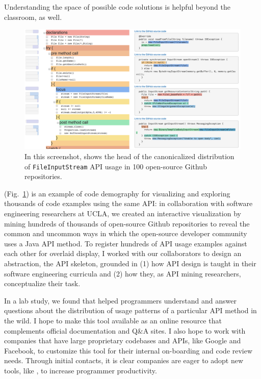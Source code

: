 \documentclass[justified]{tufte-handout}
\begin{document}
Understanding the space of possible code solutions is helpful beyond the classroom, as well. 
\begin{figure}[h]
  \includegraphics[width=0.65\linewidth]{Statistical_Code_Examples.png}%
  \caption{In this screenshot,  shows the head of the canonicalized distribution of \texttt{FileInputStream} API usage in 100 open-source Github repositories.}%
  \label{fig:examplore}%
\end{figure}
 (Fig.~\ref{fig:examplore}) is an example of code demography for visualizing and exploring thousands of code examples using the same API: in collaboration with software engineering researchers at UCLA, we created an interactive visualization by mining hundreds of thousands of open-source Github repositories to reveal the common and uncommon ways in which the open-source developer community uses a Java API method.\cite{examplore} To register hundreds of API usage examples against each other for overlaid display, I worked with our collaborators to design an abstraction, the API skeleton, grounded in (1) how API design is taught in their software engineering curricula and (2) how they, as API mining researchers, conceptualize their task. %

In a lab study, we found that  helped programmers understand and answer questions about the distribution of usage patterns of a particular API method in the wild. I hope to make this tool available as an online resource that complements official documentation and Q\&A sites. I also hope to work with companies that have large proprietary codebases and APIs, like Google and Facebook, to customize this tool for their internal on-boarding and code review needs. Through initial contacts, it is clear companies are eager to adopt new tools, like , to increase programmer productivity. 
\end{document}
